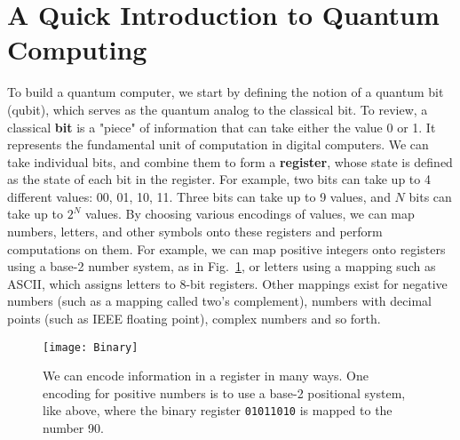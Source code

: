 \section{A Quick Introduction to Quantum Computing}
\label{sec:qc}
To build a quantum computer, we start by defining the notion of a quantum bit (qubit), which
serves as the quantum analog to the classical bit. To review, a classical \textbf{bit} is a "piece" of information
that can take either the value 0 or 1. It represents the fundamental unit of computation in digital computers.
We can take individual bits, and combine them to form a \textbf{register}, whose state is defined as
the state of each bit in the register. For example, two bits can take up to 4 different
values: 00, 01, 10, 11. Three bits can take up to 9 values, and $N$ bits can take up to $2^N$ values.
By choosing various encodings of values, we can map numbers, letters, and other symbols onto these registers
and perform computations on them. For example, we can map positive integers onto registers using a base-2 number
system, as in Fig.~\ref{fig:binary}, or letters using a mapping such as ASCII, which assigns letters to 8-bit registers.
Other mappings exist for negative numbers (such as a mapping called two's complement), numbers with
decimal points (such as IEEE floating point), complex numbers and so forth.

\begin{figure}
  \texttt{[image: Binary]}
  \caption[Binary Coding]
  {We can encode information in a register in many ways. One encoding for positive numbers is to use a base-2
  positional system, like above, where the binary register \texttt{01011010} is mapped to the number 90.}
  \label{fig:binary}
\end{figure}


